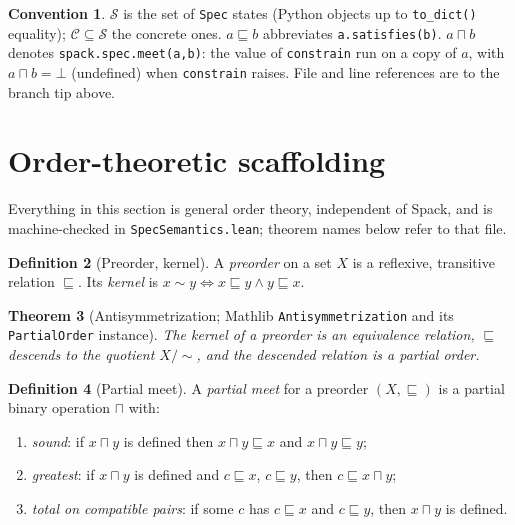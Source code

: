 \documentclass[11pt]{article}
\newtheorem{theorem}{Theorem}[section]
\theoremstyle{definition}
\newtheorem{definition}[theorem]{Definition}
\newtheorem{convention}[theorem]{Convention}
\theoremstyle{remark}
\newcommand{\sat}{\sqsubseteq}
\renewcommand{\ker}{\sim}
\newcommand{\meet}{\sqcap}
\newcommand{\Spec}{\mathcal{S}}
\newcommand{\Conc}{\mathcal{C}}
\newcommand{\code}[1]{\texttt{#1}}
\begin{document}
\begin{convention}
$\Spec$ is the set of \code{Spec} states (Python objects up to
\code{to\_dict()} equality); $\Conc \subseteq \Spec$ the concrete ones.
$a \sat b$ abbreviates \code{a.satisfies(b)}.  $a \meet b$ denotes
\code{spack.spec.meet(a,b)}: the value of \code{constrain} run on a copy of
$a$, with $a \meet b = \bot$ (undefined) when \code{constrain} raises.  File
and line references are to the branch tip above.
\end{convention}

\section{Order-theoretic scaffolding}\label{sec:order}

Everything in this section is general order theory, independent of Spack, and
is machine-checked in \code{SpecSemantics.lean}; theorem names below refer to
that file.

\begin{definition}[Preorder, kernel]
A \emph{preorder} on a set $X$ is a reflexive, transitive relation
$\sqsubseteq$.  Its \emph{kernel} is $x \ker y \iff x \sqsubseteq y \wedge y
\sqsubseteq x$.
\end{definition}

\begin{theorem}[Antisymmetrization; Mathlib \code{Antisymmetrization} and its
\code{PartialOrder} instance]
\label{thm:quotient}
The kernel of a preorder is an equivalence relation, $\sqsubseteq$ descends to
the quotient $X/\!\ker$, and the descended relation is a partial order.
\end{theorem}

\begin{definition}[Partial meet]\label{def:meet}
A \emph{partial meet} for a preorder $(X, \sqsubseteq)$ is a partial binary
operation $\meet$ with:
\begin{enumerate}[label=(M\arabic*),itemsep=1pt]
  \item \emph{sound}: if $x \meet y$ is defined then $x \meet y \sqsubseteq x$
        and $x \meet y \sqsubseteq y$;
  \item \emph{greatest}: if $x \meet y$ is defined and $c \sqsubseteq x$,
        $c \sqsubseteq y$, then $c \sqsubseteq x \meet y$;
  \item \emph{total on compatible pairs}: if some $c$ has $c \sqsubseteq x$ and
        $c \sqsubseteq y$, then $x \meet y$ is defined.
\end{enumerate}
\end{definition}
\end{document}
